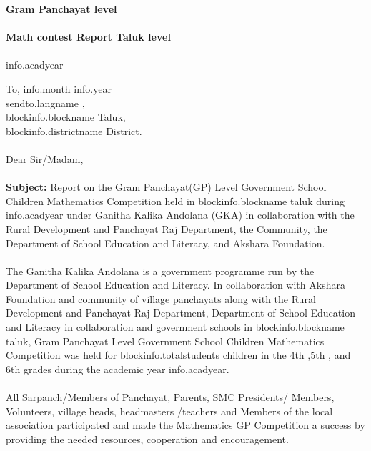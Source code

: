 \documentclass[12pt]{article}
\begin{document}
\begin{titlepage}
    \thispagestyle{title}
    \begin{center}
    \vspace*{10.5cm}
     \textbf{\huge Gram Panchayat level} \\~\\
        \textbf{\huge Math contest Report Taluk level} \\~\\
	    \Large{{info.acadyear}}
    \end{center}
\end{titlepage}
\pagebreak

\thispagestyle{plain}
{
\setlength{\parindent}{0in}
To, \hfill  {{info.month}} {{info.year}} \\ [2ex]
{{sendto.langname}} ,\\ [1ex]
{{blockinfo.blockname}} Taluk,\\ [1ex]
{{blockinfo.districtname}} District.
\\~\\ [3ex]
Dear Sir/Madam,
\\~\\
\textbf{Subject:} Report on the Gram Panchayat(GP)  Level Government School Children Mathematics Competition held in {{blockinfo.blockname}} taluk during {{info.acadyear}} under Ganitha Kalika Andolana (GKA) in collaboration with the Rural Development and Panchayat Raj Department, the Community, the Department of School Education and Literacy, and Akshara Foundation.
\\~\\[3ex]
The Ganitha Kalika Andolana is a government programme run by the Department of School Education and Literacy. In collaboration with Akshara Foundation and community of village panchayats along with the Rural Development and Panchayat Raj Department, Department of School Education and Literacy in collaboration and  government schools in {{blockinfo.blockname}} taluk, Gram Panchayat Level Government School Children Mathematics Competition was held for {{blockinfo.totalstudents}} children in the 4th ,5th , and 6th  grades during the academic year {{info.acadyear}}.
\\~\\[2ex]
All Sarpanch/Members of Panchayat, Parents, SMC Presidents/ Members, Volunteers, village heads, headmasters /teachers and Members of the local association participated and made the Mathematics GP Competition a success by providing the needed  resources, cooperation and encouragement.
\\~\\[2ex]
}
\end{document}
